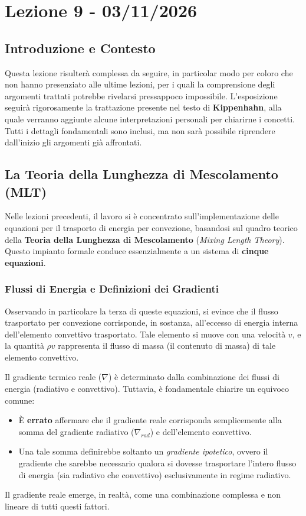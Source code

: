 \chapter{Lezione 9 - 03/11/2026}

\section{Introduzione e Contesto}

Questa lezione risulterà complessa da seguire, in particolar modo per coloro che non hanno presenziato alle ultime lezioni, per i quali la comprensione degli argomenti trattati potrebbe rivelarsi pressappoco impossibile. L'esposizione seguirà rigorosamente la trattazione presente nel testo di \textbf{Kippenhahn}, alla quale verranno aggiunte alcune interpretazioni personali per chiarirne i concetti. Tutti i dettagli fondamentali sono inclusi, ma non sarà possibile riprendere dall'inizio gli argomenti già affrontati.

\section{La Teoria della Lunghezza di Mescolamento (MLT)}

Nelle lezioni precedenti, il lavoro si è concentrato sull'implementazione delle equazioni per il trasporto di energia per convezione, basandosi sul quadro teorico della \textbf{Teoria della Lunghezza di Mescolamento} (\textit{Mixing Length Theory}). Questo impianto formale conduce essenzialmente a un sistema di \textbf{cinque equazioni}.

\subsection{Flussi di Energia e Definizioni dei Gradienti}

Osservando in particolare la terza di queste equazioni, si evince che il flusso trasportato per convezione corrisponde, in sostanza, all'eccesso di energia interna dell'elemento convettivo trasportato. Tale elemento si muove con una velocità $v$, e la quantità $\rho v$ rappresenta il flusso di massa (il contenuto di massa) di tale elemento convettivo.

Il gradiente termico reale ($\nabla$) è determinato dalla combinazione dei flussi di energia (radiativo e convettivo). Tuttavia, è fondamentale chiarire un equivoco comune:
\begin{itemize}
\item È \textbf{errato} affermare che il gradiente reale corrisponda semplicemente alla somma del gradiente radiativo ($\nabla_{rad}$) e dell'elemento convettivo.
\item Una tale somma definirebbe soltanto un \textit{gradiente ipotetico}, ovvero il gradiente che sarebbe necessario qualora si dovesse trasportare l'intero flusso di energia (sia radiativo che convettivo) esclusivamente in regime radiativo.
\end{itemize}
Il gradiente reale emerge, in realtà, come una combinazione complessa e non lineare di tutti questi fattori.

